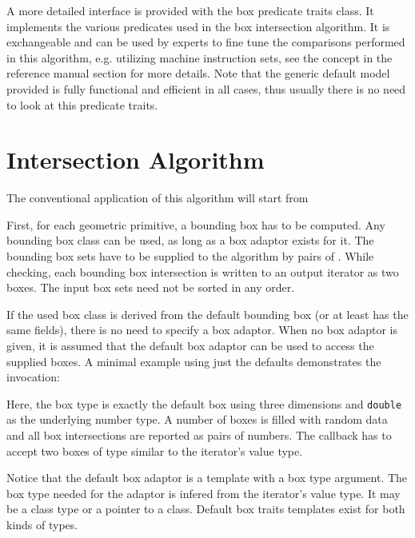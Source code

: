 {\begin{ccAdvanced}
  A more detailed interface is provided with the box predicate traits
  class. It implements the various predicates used in the box
  intersection algorithm. It is exchangeable and can be used by
  experts to fine tune the comparisons performed in this algorithm,
  e.g. utilizing machine instruction sets, see the
   concept in the reference manual section
  for more details. Note that the generic default model provided is
  fully functional and efficient in all cases, thus usually there is
  no need to look at this predicate traits. 
\end{ccAdvanced}



\section{Intersection Algorithm}

The conventional application of this algorithm will start from 

First, for each geometric primitive, a bounding box has to be
computed. Any bounding box class can be used, as long as a box adaptor
exists for it. The bounding box sets have to be supplied to the
algorithm by pairs of . While checking,
each bounding box intersection is written to an output iterator as two
boxes. The input box sets need not be sorted in any order.

If the used box class is derived from the default bounding box (or at
least has the same fields), there is no need to specify a box adaptor.
When no box adaptor is given, it is assumed that the default box
adaptor can be used to access the supplied boxes. A minimal example
using just the defaults demonstrates the invocation:


Here, the box type is exactly the default box using three dimensions
and \texttt{double} as the underlying number type. A number of boxes
is filled with random data and all box intersections are reported as
pairs of numbers. The callback has to accept two boxes of type similar
to the iterator's value type.

Notice that the default box adaptor is a template with a box type
argument. The box type needed for the adaptor is infered from the
iterator's value type. It may be a class type or a pointer to a class.
Default box traits templates exist for both kinds of types.

}
